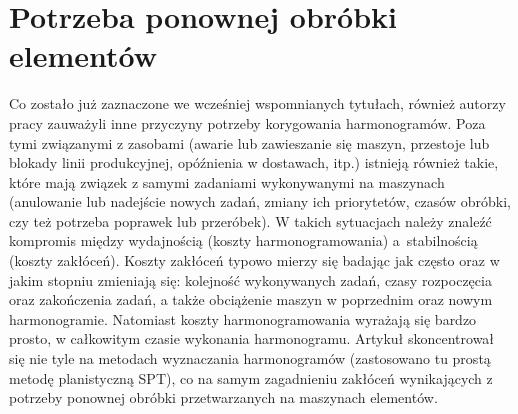\documentclass[archivemode]{mgr}
\begin{document}
\section{Potrzeba ponownej obróbki elementów}
Co zostało już zaznaczone we wcześniej wspomnianych tytułach, również autorzy pracy \cite{IPMRWJRD} zauważyli inne przyczyny potrzeby korygowania harmonogramów. Poza tymi związanymi z zasobami (awarie lub zawieszanie się maszyn, przestoje lub blokady linii produkcyjnej, opóźnienia w dostawach, itp.) istnieją również takie, które mają związek z samymi zadaniami wykonywanymi na maszynach (anulowanie lub nadejście nowych zadań, zmiany ich priorytetów, czasów obróbki, czy też potrzeba poprawek lub przeróbek). W takich sytuacjach należy znaleźć kompromis między wydajnością (koszty harmonogramowania) a~stabilnością (koszty zakłóceń). Koszty zakłóceń typowo mierzy się badając jak często oraz w jakim stopniu zmieniają się: kolejność wykonywanych zadań, czasy rozpoczęcia oraz zakończenia zadań, a także obciążenie maszyn w poprzednim oraz nowym harmonogramie. Natomiast koszty  harmonogramowania wyrażają się bardzo prosto, w całkowitym czasie wykonania harmonogramu. Artykuł skoncentrował się nie tyle na metodach wyznaczania harmonogramów (zastosowano tu prostą metodę planistyczną SPT), co na samym zagadnieniu zakłóceń wynikających z potrzeby ponownej obróbki przetwarzanych na maszynach elementów.
%
\end{document}
